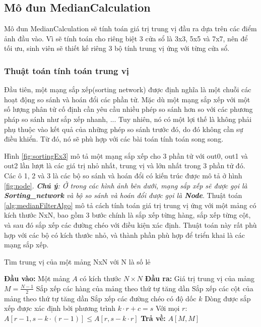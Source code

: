 \subsection{Mô đun MedianCalculation}
Mô đun MedianCalculation sẽ tính toán giá trị trung vị đầu ra dựa trên các điểm ảnh đầu vào. Vì sẽ tính toán cho riêng biệt 3 cửa sổ là 3x3, 5x5 và 7x7, nên để tối ưu, sinh viên sẽ thiết kế riêng 3 bộ tính trung vị ứng với từng cửa sổ.


\subsubsection{Thuật toán tính toán trung vị}
Đầu tiên, một mạng sắp xếp(sorting network) được định nghĩa là một chuỗi các hoạt động so sánh và hoán đổi các phần tử. Mặc dù một mạng sắp xếp với một số lượng phân tử cố định cần yêu cầu nhiều phép so sánh hơn so với các phương pháp so sánh như sắp xếp nhanh, ... Tuy nhiên, nó có một lợi thế là không phải phụ thuộc vào kết quả của những phép so sánh trước đó, do đó không cần sự điều khiển. Từ đó, nó sẽ phù hợp với các bài toán tính toán song song.


Hình \ref{fig:sortingEx3} mô tả một mạng sắp xếp cho 3 phần tử với out0, out1 và out2 lần lượt là các giá trị nhỏ nhất, trung vị và lớn nhất trong 3 phần tử đó. Các ô 1, 2 và 3 là các bộ so sánh và hoán đổi có kiến trúc được mô tả ở hình \ref{fig:node}. \textit{\textbf{Chú ý}: Ở trong các hình ảnh bên dưới, mạng sắp xếp sẽ được gọi là \textbf{Sorting\_network} và bộ so sánh và hoán đổi được gọi là \textbf{Node}}. Thuật toán \ref{alg:medianFilterAlgo} mô tả cách tính toán giá trị trung vị ứng với một mảng có kích thước NxN, bao gồm 3 bước chính là sắp xếp từng hàng, sắp xếp từng cột, và sau đó sắp xếp các đường chéo với điều kiện xác định. Thuật toán này rất phù hợp với các bộ có kích thước nhỏ, và thành phần phù hợp để triển khai là các mạng sắp xếp.

\begin{algorithm}
	\caption{Tìm trung vị của một mảng NxN với N là số lẻ}
	\begin{algorithmic}[1]
		\State \textbf{Đầu vào:} Một mảng $A$ có kích thước $N \times N$
		\State \textbf{Đầu ra:} Giá trị trung vị của mảng
		\State $M = \frac{N - 1}{2}$
		\State Sắp xếp các hàng của mảng theo thứ tự tăng dần
		\State Sắp xếp các cột của mảng theo thứ tự tăng dần
		\State Sắp xếp các đường chéo có độ dốc $k$
		\State Dòng được sắp xếp được xác định bởi phương trình $k \cdot r + c = s$
		\State Với mọi $r$: $A[r-1, s - k \cdot (r-1)] \leq A[r, s - k \cdot r]$
		\EndFor
		\EndFor
		\State \textbf{Trả về:} $A[M, M]$
	\end{algorithmic}
	\label{alg:medianFilterAlgo}
\end{algorithm}




